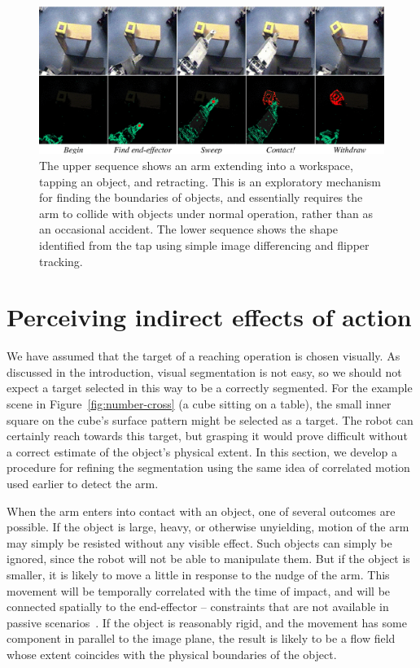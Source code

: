 
\begin{figure}[tbh]
\begin{center}
\includegraphics[width=\textwidth]{poking-sequence.eps}
\caption{ 
\label{fig:poking-sequence}
%
  The upper sequence shows an arm extending into a workspace, tapping
  an object, and retracting.  This is an exploratory mechanism for
  finding the boundaries of objects, and essentially requires the arm
  to collide with objects under normal operation, rather than as an
  occasional accident.  The lower sequence shows the shape
  identified from the tap using simple image differencing and flipper
  tracking.
%
}
\end{center}
\end{figure}


\section{Perceiving indirect effects of action}

We have assumed that the target of a reaching operation is chosen
visually.  As discussed in the introduction, visual
segmentation is not easy, so we should not expect a target selected in
this way to be a correctly segmented.  For the example scene in
Figure~\ref{fig:number-cross} 
(a cube sitting on a table), the small
inner square on the cube's surface pattern might be selected as a
target.  The robot can certainly reach towards this target, but
grasping it would prove difficult without a correct estimate of the
object's physical extent.  In this section, we develop a procedure
for refining the segmentation using the same idea of correlated
motion used earlier to detect the arm.

When the arm enters into contact with an object, one of several
outcomes are possible.  If the object is large, heavy, or otherwise
unyielding, motion of the arm may simply be resisted without any
visible effect.  Such objects can simply be ignored, since the robot
will not be able to manipulate them.  But if the object is smaller, it
is likely to move a little in response to the nudge of the arm.  This
movement will be temporally correlated with the time of impact, and
will be connected spatially to the end-effector -- constraints that
are not available in passive scenarios~\cite{birchfield99depth}.  If
the object is reasonably rigid, and the movement has some component in
parallel to the image plane, the result is likely to be a flow field
whose extent coincides with the physical boundaries of the object.



